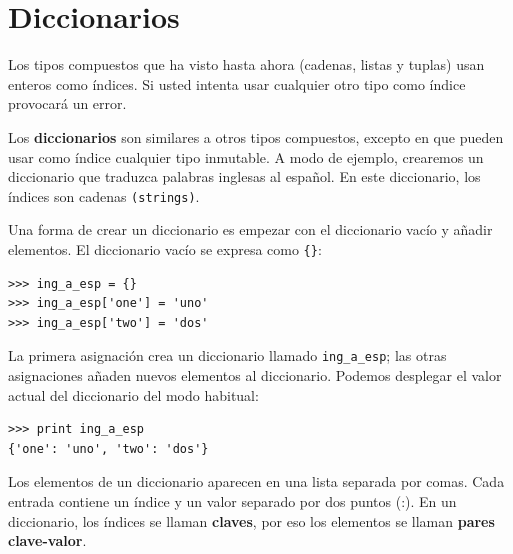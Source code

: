 


\chapter{Diccionarios}


Los tipos compuestos que ha visto hasta ahora (cadenas, listas y tuplas) usan enteros como índices. 
Si usted intenta usar cualquier otro tipo como índice provocará un error.

Los {\bf diccionarios} son similares a otros tipos compuestos, excepto en que pueden usar 
como índice cualquier tipo inmutable. A modo de ejemplo, crearemos un diccionario que traduzca 
palabras inglesas al español. En este diccionario, los índices son cadenas \texttt{(strings)}.

Una forma de crear un diccionario es empezar con el diccionario vacío y añadir elementos. El 
diccionario vacío se expresa como \texttt{\{\}}:

\beforeverb
\begin{verbatim}
>>> ing_a_esp = {}
>>> ing_a_esp['one'] = 'uno'
>>> ing_a_esp['two'] = 'dos'
\end{verbatim}
\afterverb
%
La primera asignación crea un diccionario llamado \texttt{ing\_a\_esp}; las otras asignaciones 
añaden nuevos elementos al diccionario. Podemos desplegar el valor actual del diccionario 
del modo habitual:

\beforeverb
\begin{verbatim}
>>> print ing_a_esp
{'one': 'uno', 'two': 'dos'}
\end{verbatim}
\afterverb
%
Los elementos de un diccionario aparecen en una lista separada por comas. Cada entrada 
contiene un índice y un valor separado por dos puntos (:). En un diccionario, los índices 
se llaman {\bf claves}, por eso los elementos se llaman {\bf pares clave-valor}.


